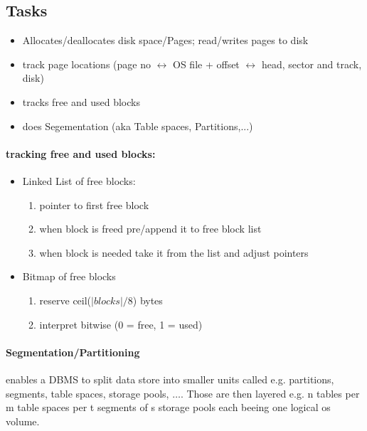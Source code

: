 \subsection{Tasks}
\begin{itemize}
    \item Allocates/deallocates disk space/Pages; read/writes pages to disk
    \item track page locations (page no $\leftrightarrow$ OS file + offset $\leftrightarrow$ head, sector and track, disk) 
    \item tracks free and used blocks
    \item does Segementation (aka Table spaces, Partitions,...)
\end{itemize}

 
\paragraph{tracking free and used blocks:}
 \begin{itemize}
    \item Linked List of free blocks: 
        \begin{enumerate}
             \item pointer to first free block
             \item when block is freed pre/append it to free block list
            \item when block is needed take it from the list and adjust pointers
        \end{enumerate}
        
        \item Bitmap of free blocks
        \begin{enumerate}
             \item reserve ceil($|blocks|/8$) bytes 
             \item interpret bitwise (0 = free, 1 = used)
        \end{enumerate}
 \end{itemize}
 
 \paragraph{Segmentation/Partitioning} enables a DBMS to split data store into smaller units called e.g. partitions, segments, table spaces, storage pools, $\dots$. Those are then layered e.g. n tables per m table spaces per t segments of s storage pools each beeing one logical os volume.

